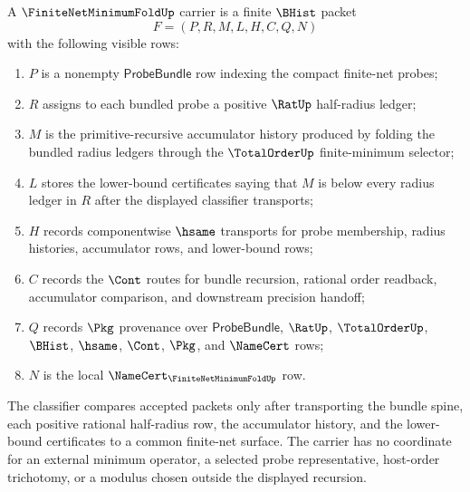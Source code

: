 \begin{definition}
\label{def:finite-net-minimum-fold-carrier}
A $\FiniteNetMinimumFoldUp$ carrier is a finite $\BHist$ packet
$$
F=(P,R,M,L,H,C,Q,N)
$$
with the following visible rows:
\begin{enumerate}
\item $P$ is a nonempty $\mathsf{ProbeBundle}$ row indexing the compact finite-net probes;
\item $R$ assigns to each bundled probe a positive $\RatUp$ half-radius ledger;
\item $M$ is the primitive-recursive accumulator history produced by folding the bundled radius ledgers through the $\TotalOrderUp$ finite-minimum selector;
\item $L$ stores the lower-bound certificates saying that $M$ is below every radius ledger in $R$ after the displayed classifier transports;
\item $H$ records componentwise $\hsame$ transports for probe membership, radius histories, accumulator rows, and lower-bound rows;
\item $C$ records the $\Cont$ routes for bundle recursion, rational order readback, accumulator comparison, and downstream precision handoff;
\item $Q$ records $\Pkg$ provenance over $\mathsf{ProbeBundle}$, $\RatUp$, $\TotalOrderUp$, $\BHist$, $\hsame$, $\Cont$, $\Pkg$, and $\NameCert$ rows;
\item $N$ is the local $\NameCert_{\FiniteNetMinimumFoldUp}$ row.
\end{enumerate}
The classifier compares accepted packets only after transporting the bundle spine, each positive rational half-radius row, the accumulator history, and the lower-bound certificates to a common finite-net surface. The carrier has no coordinate for an external minimum operator, a selected probe representative, host-order trichotomy, or a modulus chosen outside the displayed recursion.
\end{definition}

